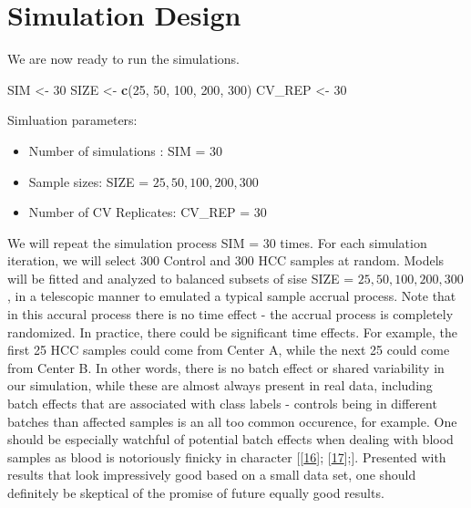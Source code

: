 \documentclass[
]{book}
\newenvironment{Shaded}{\begin{snugshade}}{\end{snugshade}}
\newcommand{\DecValTok}[1]{\textcolor[rgb]{0.00,0.00,0.81}{#1}}
\newcommand{\KeywordTok}[1]{\textcolor[rgb]{0.13,0.29,0.53}{\textbf{#1}}}
\newcommand{\NormalTok}[1]{#1}
\newcommand{\StringTok}[1]{\textcolor[rgb]{0.31,0.60,0.02}{#1}}
\begin{document}
\hypertarget{simulation-design}{%
\section{Simulation Design}\label{simulation-design}}

We are now ready to run the simulations.

\begin{Shaded}
\begin{Highlighting}[]
\NormalTok{ SIM <{-}}\StringTok{ }\DecValTok{30}
\NormalTok{ SIZE <{-}}\StringTok{ }\KeywordTok{c}\NormalTok{(}\DecValTok{25}\NormalTok{, }\DecValTok{50}\NormalTok{, }\DecValTok{100}\NormalTok{, }\DecValTok{200}\NormalTok{, }\DecValTok{300}\NormalTok{)}
\NormalTok{ CV\_REP <{-}}\StringTok{ }\DecValTok{30}
\end{Highlighting}
\end{Shaded}

Simluation parameters:

\begin{itemize}
\item
  Number of simulations : SIM = \(30\)
\item
  Sample sizes: SIZE = \(25, 50, 100, 200, 300\)
\item
  Number of CV Replicates: CV\_REP = \(30\)
\end{itemize}

We will repeat the simulation process SIM = \(30\) times.
For each simulation iteration, we will select \(300\) Control and
\(300\) HCC samples at random. Models will be fitted and analyzed
to balanced subsets of sise SIZE = \(25, 50, 100, 200, 300\), in a telescopic manner to
emulated a typical sample accrual process. Note that in this accural process
there is no time effect - the accrual process is completely randomized. In practice,
there could be significant time effects. For example, the first 25 HCC samples could come
from Center A, while the next 25 could come from Center B. In other words,
there is no batch effect or shared variability in our simulation,
while these are almost always present in real data, including
batch effects that are associated with class labels - controls being in
different batches than affected samples is an all too common occurence,
for example. One should be especially watchful of potential batch effects
when dealing with blood samples as blood is notoriously finicky in
character {[}{[}\protect\hyperlink{ref-Huang:2017aa}{16}{]}; {[}\protect\hyperlink{ref-Permenter:2015aa}{17}{]};{]}.
Presented with results that look impressively good based on a small data set,
one should definitely be skeptical of the promise of future equally good results.
\end{document}
